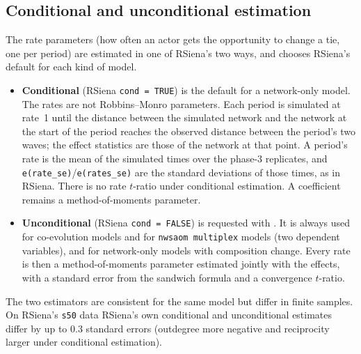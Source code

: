 \subsection{Conditional and unconditional estimation}
The rate parameters (how often an actor gets the opportunity to change a tie, one per period) are estimated in one of RSiena's two ways, and \nwsaom{} chooses RSiena's default for each kind of model.
\begin{itemize}
\item \textbf{Conditional} (RSiena \texttt{cond = TRUE}) is the default for a network-only model. The rates are not Robbins--Monro parameters. Each period is simulated at rate~1 until the distance between the simulated network and the network at the start of the period reaches the observed distance between the period's two waves; the effect statistics are those of the network at that point. A period's rate is the mean of the simulated times over the  phase-3 replicates, and \texttt{e(rate\_se)}/\texttt{e(rates\_se)} are the standard deviations of those times, as in RSiena. There is no rate $t$-ratio under conditional estimation. A  coefficient remains a method-of-moments parameter.
\item \textbf{Unconditional} (RSiena \texttt{cond = FALSE}) is requested with . It is always used for co-evolution models and for \texttt{nwsaom multiplex} models (two dependent variables), and for network-only models with composition change. Every rate is then a method-of-moments parameter estimated jointly with the effects, with a standard error from the sandwich formula and a convergence $t$-ratio.
\end{itemize}
The two estimators are consistent for the same model but differ in finite samples. On RSiena's \texttt{s50} data RSiena's own conditional and unconditional estimates differ by up to 0.3 standard errors (outdegree more negative and reciprocity larger under conditional estimation).

